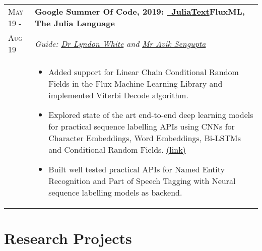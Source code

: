 \documentclass[a4paper,10pt]{extarticle} %
\begin{document}
\begin{tabularx}{\linewidth}{ l | X }

\textsc{May 19 -} & \textbf{Google Summer Of Code, 2019: {\href{https://github.com/JuliaText}{\ JuliaText}}}\hfill\textbf{FluxML, The Julia Language}\\
    \textsc{Aug 19}& {\textit{Guide: \href{https://www.linkedin.com/in/lyndon-white-46b9a035/}{Dr Lyndon White} and \href{https://www.linkedin.com/in/aviks}{Mr Avik Sengupta}}} \\
    & \begin{itemize}[leftmargin=.1in]
        \item Added support for Linear Chain Conditional Random Fields in the Flux Machine Learning Library and implemented Viterbi Decode algorithm.
        \item Explored state of the art end-to-end deep learning models for practical sequence labelling APIs using CNNs for Character Embeddings, Word Embeddings, Bi-LSTMs and Conditional Random Fields. \href{https://github.com/Ayushk4/NER.jl/tree/master/Sequence_models}{(link)}
        \item Built well tested practical APIs for Named Entity Recognition and Part of Speech Tagging with Neural sequence labelling models as backend.
    \end{itemize}
\end{tabularx}

\section{\textcolor{primary}{Research Projects}}
\end{document}
